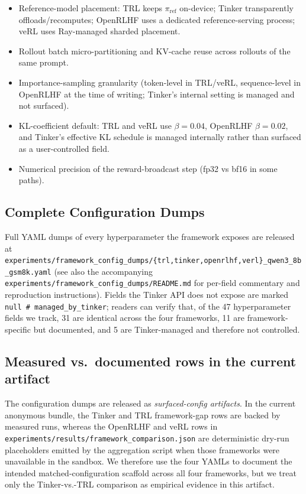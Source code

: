 \begin{itemize}[leftmargin=1.2em,itemsep=1pt]
  \item Reference-model placement: TRL keeps $\pi_\text{ref}$ on-device;
        Tinker transparently offloads/recomputes; OpenRLHF uses a
        dedicated reference-serving process; veRL uses Ray-managed
        sharded placement.
  \item Rollout batch micro-partitioning and KV-cache reuse across
        rollouts of the same prompt.
  \item Importance-sampling granularity (token-level in TRL/veRL,
        sequence-level in OpenRLHF at the time of writing; Tinker's
        internal setting is managed and not surfaced).
  \item KL-coefficient default: TRL and veRL use $\beta=0.04$,
        OpenRLHF $\beta=0.02$, and Tinker's effective KL schedule is
        managed internally rather than surfaced as a user-controlled field.
  \item Numerical precision of the reward-broadcast step (fp32 vs
        bf16 in some paths).
\end{itemize}

\subsection{Complete Configuration Dumps}

Full YAML dumps of every hyperparameter the framework exposes are
released at
\texttt{experiments/framework\_config\_dumps/\{trl,tinker,openrlhf,verl\}\_qwen3\_8b\_gsm8k.yaml}
(see also the accompanying
\texttt{experiments/framework\_config\_dumps/README.md} for per-field
commentary and reproduction instructions).
Fields the Tinker API does not expose are marked
\texttt{null\ \#\ managed\_by\_tinker}; readers can verify that, of
the 47 hyperparameter fields we track, 31 are identical across the
four frameworks, 11 are framework-specific but documented, and 5 are
Tinker-managed and therefore not controlled.

\subsection{Measured vs.\ documented rows in the current artifact}

The configuration dumps are released as \emph{surfaced-config artifacts}.
In the current anonymous bundle, the Tinker and TRL framework-gap rows are
backed by measured runs, whereas the OpenRLHF and veRL rows in
\texttt{experiments/results/framework\_comparison.json} are deterministic
dry-run placeholders emitted by the aggregation script when those
frameworks were unavailable in the sandbox. We therefore use the four YAMLs
to document the intended matched-configuration scaffold across all four
frameworks, but we treat only the Tinker-vs.-TRL comparison as empirical
evidence in this artifact.

